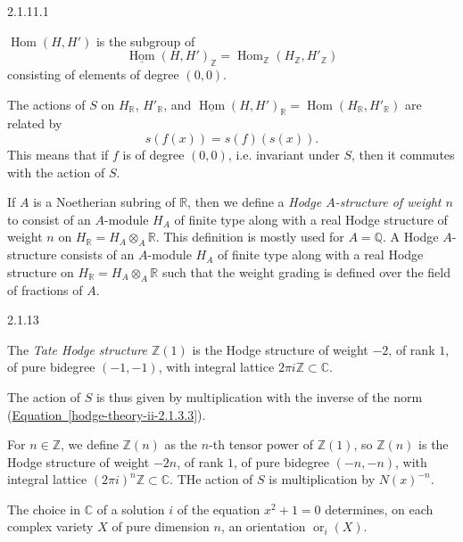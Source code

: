     \begin{remark}{2.1.11.1}\label{hodge-theory-ii-2.1.11.1}\skipsinglepar\par{}\(\operatorname {Hom}(H,H')\) is the subgroup of
        \[           \underline {\operatorname {Hom}}(H,H')_\mathbb {Z}           = \operatorname {Hom}_\mathbb {Z}(H_\mathbb {Z},H'_\mathbb {Z})         \]
        consisting of elements of degree \((0,0)\).\end{remark}\par{}The actions of \(S\) on \(H_\mathbb {R}\), \(H'_\mathbb {R}\), and \(\underline {\operatorname {Hom}}(H,H')_\mathbb {R}=\operatorname {Hom}(H_\mathbb {R},H'_\mathbb {R})\) are related by
    \[       s(f(x))       = s(f)(s(x)).     \]
    This means that if \(f\) is of degree \((0,0)\), i.e. invariant under \(S\), then it commutes with the action of \(S\).\label{hodge-theory-ii-2.1.12}\par{}If \(A\) is a Noetherian subring of \(\mathbb {R}\), then we define a \emph{Hodge \(A\)-structure of weight \(n\)} to consist of an \(A\)-module \(H_A\) of finite type along with a real Hodge structure of weight \(n\) on \(H_\mathbb {R}=H_A\otimes _A\mathbb {R}\).
    This definition is mostly used for \(A=\mathbb {Q}\).
    A Hodge \(A\)-structure consists of an \(A\)-module \(H_A\) of finite type along with a real Hodge structure on \(H_\mathbb {R}=H_A\otimes _A\mathbb {R}\) such that the weight grading is defined over the field of fractions of \(A\).\begin{definition}{2.1.13}\label{hodge-theory-ii-2.1.13}\skipsinglepar\par{}The \emph{Tate Hodge structure \(\mathbb {Z}(1)\)} is the Hodge structure of weight \(-2\), of rank \(1\), of pure bidegree \((-1,-1)\), with integral lattice \(2\pi  i\mathbb {Z}\subset \mathbb {C}\).\par{}The action of \(S\) is thus given by multiplication with the inverse of the norm (\hyperref[hodge-theory-ii-2.1.3.3]{Equation~\ref*{hodge-theory-ii-2.1.3.3}}).\par{}For \(n\in \mathbb {Z}\), we define \(\mathbb {Z}(n)\) as the \(n\)-th tensor power of \(\mathbb {Z}(1)\), so \(\mathbb {Z}(n)\) is the Hodge structure of weight \(-2n\), of rank \(1\), of pure bidegree \((-n,-n)\), with integral lattice \((2\pi  i)^n\mathbb {Z}\subset \mathbb {C}\).
    THe action of \(S\) is multiplication by \(N(x)^{-n}\).\end{definition}\label{hodge-theory-ii-2.1.14}\par{}The choice in \(\mathbb {C}\) of a solution \(i\) of the equation \(x^2+1=0\) determines, on each complex variety \(X\) of pure dimension \(n\), an orientation \(\operatorname {or}_i(X)\).
